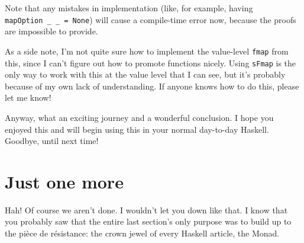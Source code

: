 \documentclass[]{article}
\begin{document}
Note that any mistakes in implementation (like, for example, having
\texttt{mapOption\ \_\ \_\ =\ None}) will cause a compile-time error now,
because the proofs are impossible to provide.

As a side note, I'm not quite sure how to implement the value-level
\texttt{fmap} from this, since I can't figure out how to promote functions
nicely. Using \texttt{sFmap} is the only way to work with this at the value
level that I can see, but it's probably because of my own lack of understanding.
If anyone knows how to do this, please let me know!

Anyway, what an exciting journey and a wonderful conclusion. I hope you enjoyed
this and will begin using this in your normal day-to-day Haskell. Goodbye, until
next time!

\hypertarget{just-one-more}{%
\section{Just one more}\label{just-one-more}}

Hah! Of course we aren't done. I wouldn't let you down like that. I know that
you probably saw that the entire last section's only purpose was to build up to
the pièce de résistance: the crown jewel of every Haskell article, the Monad.
\end{document}
